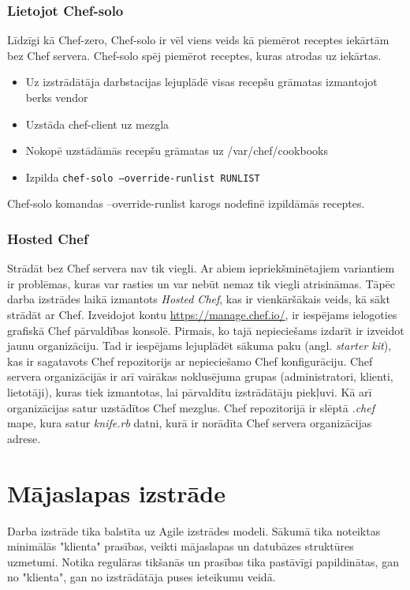 \subsubsection{Lietojot Chef-solo}
Līdzīgi kā Chef-zero, Chef-solo ir vēl viens veids kā piemērot receptes iekārtām bez Chef servera. Chef-solo spēj piemērot receptes, kuras atrodas uz iekārtas.
\begin{itemize}
	\item Uz izstrādātāja darbstacijas lejuplādē visas recepšu grāmatas izmantojot berks vendor
	\item Uzstāda chef-client uz mezgla
	\item Nokopē uzstādāmās recepšu grāmatas uz /var/chef/cookbooks
	\item Izpilda \texttt{chef-solo --override-runlist RUNLIST}
\end{itemize}
Chef-solo komandas --override-runlist karogs nodefinē izpildāmās receptes.

\subsubsection{Hosted Chef}
Strādāt bez Chef servera nav tik viegli. Ar abiem iepriekšminētajiem variantiem ir problēmas, kuras var rasties un var nebūt nemaz tik viegli atrisināmas.
Tāpēc darba izstrādes laikā izmantots \textit{Hosted Chef}, kas ir vienkāršākais veids, kā sākt strādāt ar Chef.
Izveidojot kontu \url{https://manage.chef.io/}, ir iespējams ielogoties grafiskā Chef pārvaldības konsolē.
Pirmais, ko tajā nepieciešams izdarīt ir izveidot jaunu organizāciju. Tad ir iespējams lejuplādēt sākuma paku (angl. \textit{starter kit}), kas ir sagatavots Chef repozitorijs ar nepieciešamo Chef konfigurāciju. Chef servera organizācijās ir arī vairākas noklusējuma grupas (administratori, klienti, lietotāji), kuras tiek izmantotas, lai pārvaldītu izstrādātāju piekļuvi. Kā arī organizācijas satur uzstādītos Chef mezglus. Chef repozitorijā ir slēptā \textit{.chef} mape, kura satur \textit{knife.rb} datni, kurā ir norādīta Chef servera organizācijas adrese.

\section{Mājaslapas izstrāde}
Darba izstrāde tika balstīta uz Agile izstrādes modeli. Sākumā tika noteiktas minimālās "klienta" prasības, veikti mājaslapas un datubāzes struktūres uzmetumi. Notika regulāras tikšanās un prasības tika pastāvīgi papildinātas, gan no "klienta", gan no izstrādātāja puses ieteikumu veidā.

